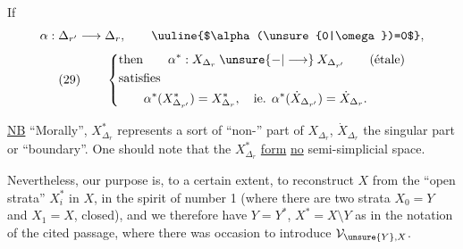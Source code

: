 If
\[
\alpha:\Delta_{r'}\longrightarrow\Delta_r,\qquad \text{\uuline{$\alpha(\unsure{0|\omega})=0$}},
\]
\[
(29)\qquad\left\{\begin{aligned}
&\text{then}\qquad \alpha^*:X_{\Delta_r}\mathbin{\unsure{-|\longrightarrow}}X_{\Delta_{r'}}\qquad(\text{étale})\\
&\text{satisfies}\\
&\qquad\alpha^*(X_{\Delta_{r'}}^*)=X_{\Delta_r}^*,\quad\text{ie. }\alpha^*(\dot X_{\Delta_{r'}})=\dot X_{\Delta_r}.
\end{aligned}\right.
\]


\uline{NB} ``Morally'', $X_{\Delta_r}^*$ represents a sort of ``non-'' part of $X_{\Delta_r}$, $\dot X_{\Delta_r}$ the singular part or ``boundary''. One should note that the $X_{\Delta_r}^*$ \uline{form} \uline{no} semi-simplicial space.

Nevertheless, our purpose is, to a certain extent, to reconstruct $X$ from the ``open strata'' $X_i^*$ in $X$, in the spirit of number 1 (where there are two strata $X_0=Y$ and $X_1=X$,   closed), and we therefore have $Y=Y^*$, $X^*=X\setminus Y$ as in the notation of the cited passage, where there was occasion to introduce $\mathcal{V}_{\unsure{Y},X}$.
